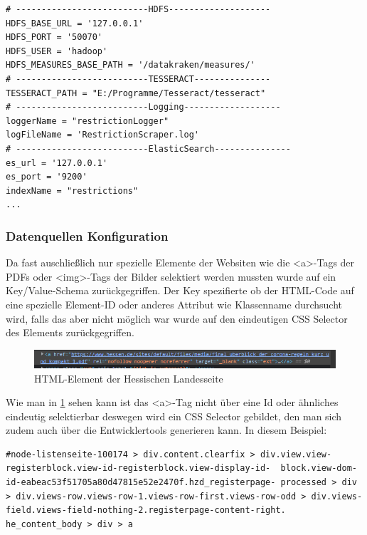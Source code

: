 \documentclass[12pt,oneside,a4paper,parskip]{scrbook}
\begin{document}
\begin{lstlisting}[basicstyle=\small, caption=Config für das Programm]
# --------------------------HDFS--------------------
HDFS_BASE_URL = '127.0.0.1'
HDFS_PORT = '50070'
HDFS_USER = 'hadoop'
HDFS_MEASURES_BASE_PATH = '/datakraken/measures/'
# --------------------------TESSERACT---------------
TESSERACT_PATH = "E:/Programme/Tesseract/tesseract"
# --------------------------Logging-------------------
loggerName = "restrictionLogger"
logFileName = 'RestrictionScraper.log'
# --------------------------ElasticSearch---------------
es_url = '127.0.0.1'
es_port = '9200'
indexName = "restrictions"
...
\end{lstlisting}

\pagebreak

\subsubsection{Datenquellen Konfiguration}
Da fast auschließlich nur spezielle Elemente der Websiten wie die \textless a\textgreater -Tags der PDFs oder  \textless img\textgreater -Tags der Bilder selektiert werden mussten wurde auf ein Key/Value-Schema zurückgegriffen. Der Key spezifierte ob der HTML-Code auf eine spezielle Element-ID oder anderes Attribut wie Klassenname durchsucht wird, falls das aber nicht möglich war wurde auf den eindeutigen CSS Selector des Elements zurückgegriffen.

\begin{figure}[H]
\caption{HTML-Element der Hessischen Landesseite}
\label{htmlHessen}
\centering
\includegraphics[scale=1.0]{hessenHTMLexample.png}
\end{figure}

Wie man in \cref{htmlHessen} sehen kann ist das \textless a\textgreater -Tag nicht über eine Id oder ähnliches eindeutig selektierbar deswegen wird ein CSS Selector gebildet, den man sich zudem auch über die Entwicklertools generieren kann. In diesem Beispiel:
\begin{lstlisting}[caption=CSS Selector]
#node-listenseite-100174 > div.content.clearfix > div.view.view-registerblock.view-id-registerblock.view-display-id-  block.view-dom-id-eabeac53f51705a80d47815e52e2470f.hzd_registerpage- processed > div > div.views-row.views-row-1.views-row-first.views-row-odd > div.views-field.views-field-nothing-2.registerpage-content-right. he_content_body > div > a
\end{lstlisting}
\end{document}
